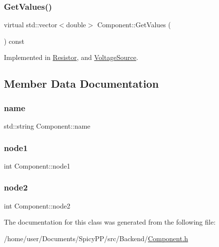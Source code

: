 \subsubsection{\texorpdfstring{Get\+Values()}{GetValues()}}
{\footnotesize\ttfamily virtual std\+::vector$<$double$>$ Component\+::\+Get\+Values (\begin{DoxyParamCaption}{ }\end{DoxyParamCaption}) const\hspace{0.3cm}{\ttfamily [pure virtual]}}



Implemented in \hyperlink{classResistor_ad4d08c34efa99287438aac338d7012d7}{Resistor}, and \hyperlink{classVoltageSource_addf30a4714e13d83fd5a18e6d9a4310b}{Voltage\+Source}.



\subsection{Member Data Documentation}
\mbox{\label{classComponent_a46343549452bda5ee9752f7a9bc15efb}} 
\subsubsection{\texorpdfstring{name}{name}}
{\footnotesize\ttfamily std\+::string Component\+::name\hspace{0.3cm}{\ttfamily [private]}}

\mbox{\label{classComponent_a7d8cd23c0aaff5c139b825e77c0b2051}} 
\subsubsection{\texorpdfstring{node1}{node1}}
{\footnotesize\ttfamily int Component\+::node1\hspace{0.3cm}{\ttfamily [private]}}

\mbox{\label{classComponent_af96df64e1eb5fac7dae7c674cac3d31e}} 
\subsubsection{\texorpdfstring{node2}{node2}}
{\footnotesize\ttfamily int Component\+::node2\hspace{0.3cm}{\ttfamily [private]}}



The documentation for this class was generated from the following file\+:\begin{DoxyCompactItemize}
\item 
/home/user/\+Documents/\+Spicy\+P\+P/src/\+Backend/\hyperlink{Component_8h}{Component.\+h}\end{DoxyCompactItemize}
